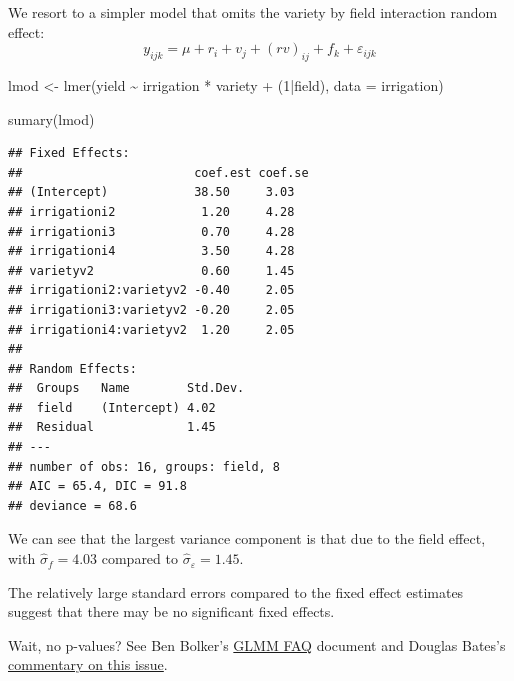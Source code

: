 \documentclass[
  ignorenonframetext,
]{beamer}
\newenvironment{Shaded}{\begin{snugshade}}{\end{snugshade}}
\newcommand{\AttributeTok}[1]{\textcolor[rgb]{0.77,0.63,0.00}{#1}}
\newcommand{\DecValTok}[1]{\textcolor[rgb]{0.00,0.00,0.81}{#1}}
\newcommand{\FunctionTok}[1]{\textcolor[rgb]{0.00,0.00,0.00}{#1}}
\newcommand{\NormalTok}[1]{#1}
\newcommand{\OtherTok}[1]{\textcolor[rgb]{0.56,0.35,0.01}{#1}}
\newcommand{\SpecialCharTok}[1]{\textcolor[rgb]{0.00,0.00,0.00}{#1}}
\begin{document}
\begin{frame}[fragile]{}
\protect\hypertarget{section-4}{}
We resort to a simpler model that omits the variety by field interaction
random effect: \[
  y_{ijk} = \mu + r_i + v_j + (rv)_{ij} + f_k + \varepsilon_{ijk}
\]

\vspace{12pt}

\begin{Shaded}
\begin{Highlighting}[]
\NormalTok{lmod }\OtherTok{\textless{}{-}} \FunctionTok{lmer}\NormalTok{(yield }\SpecialCharTok{\textasciitilde{}}\NormalTok{ irrigation }\SpecialCharTok{*}\NormalTok{ variety }\SpecialCharTok{+}\NormalTok{ (}\DecValTok{1}\SpecialCharTok{|}\NormalTok{field), }
             \AttributeTok{data =}\NormalTok{ irrigation)}
\end{Highlighting}
\end{Shaded}
\end{frame}

\begin{frame}[fragile]{}
\protect\hypertarget{section-5}{}
\small

\begin{Shaded}
\begin{Highlighting}[]
\FunctionTok{sumary}\NormalTok{(lmod)}
\end{Highlighting}
\end{Shaded}

\begin{verbatim}
## Fixed Effects:
##                        coef.est coef.se
## (Intercept)            38.50     3.03  
## irrigationi2            1.20     4.28  
## irrigationi3            0.70     4.28  
## irrigationi4            3.50     4.28  
## varietyv2               0.60     1.45  
## irrigationi2:varietyv2 -0.40     2.05  
## irrigationi3:varietyv2 -0.20     2.05  
## irrigationi4:varietyv2  1.20     2.05  
## 
## Random Effects:
##  Groups   Name        Std.Dev.
##  field    (Intercept) 4.02    
##  Residual             1.45    
## ---
## number of obs: 16, groups: field, 8
## AIC = 65.4, DIC = 91.8
## deviance = 68.6
\end{verbatim}
\end{frame}

\begin{frame}{}
\protect\hypertarget{section-6}{}
We can see that the largest variance component is that due to the field
effect, with \(\hat\sigma_f = 4.03\) compared to
\(\hat\sigma_\varepsilon = 1.45\).

The relatively large standard errors compared to the fixed effect
estimates suggest that there may be no significant fixed effects.

Wait, no p-values? See Ben Bolker's
\href{https://bbolker.github.io/mixedmodels-misc/glmmFAQ.html\#why-doesnt-lme4-display-denominator-degrees-of-freedomp-values-what-other-options-do-i-have}{GLMM
FAQ} document and Douglas Bates's
\href{https://stat.ethz.ch/pipermail/r-help/2006-May/094765.html}{commentary
on this issue}.
\end{frame}
\end{document}
